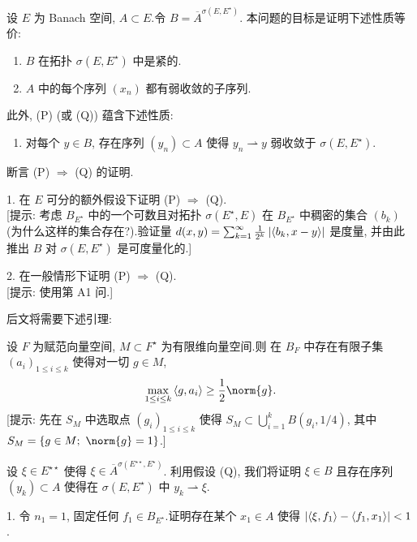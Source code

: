 \begin{problem}
\label{prob:10}
设 $E$ 为 Banach 空间, $A\subset E$.令 $B=\overline A^{\sigma(E,E^\star)}$.
本问题的目标是证明下述性质等价:
\begin{enumerate}[label=(\Alph*), itemsep=0.1em]
	\item[(P)] $B$ 在拓扑 $\sigma(E,E^\star)$ 中是紧的.
	\item[(Q)] $A$ 中的每个序列 $(x_n)$ 都有弱收敛的子序列.
\end{enumerate}
此外, (P) (或 (Q)) 蕴含下述性质:
\begin{enumerate}[label=(\Alph*), itemsep=0.1em]
	\item[(R)] 对每个 $y\in B$, 存在序列 $(y_n)\subset A$ 使得 $y_n\rightharpoonup y$ 弱收敛于 $\sigma(E,E^\star)$.
\end{enumerate}


断言 (P) $\Rightarrow$ (Q) 的证明.

1. 在 $E$ 可分的额外假设下证明 (P) $\Rightarrow$ (Q).\\
{[提示: 考虑 $B_{E^\star}$ 中的一个可数且对拓扑 $\sigma(E^\star,E)$ 在
$B_{E^\star}$ 中稠密的集合 $(b_k)$ (为什么这样的集合存在?).验证量
$d(x,y)=\sum_{k=1}^\infty\frac{1}{2^k}\left|\left\langle b_k,x-y\right\rangle\right|$ 是度量, 并由此推出
$B$ 对 $\sigma(E,E^\star)$ 是可度量化的.]}

2. 在一般情形下证明 (P) $\Rightarrow$ (Q).\\
{[提示: 使用第 A1 问.]}


后文将需要下述引理:

 设 $F$ 为赋范向量空间, $M\subset F^\star$ 为有限维向量空间.则
在 $B_F$ 中存在有限子集 $(a_i)_{1\le i\le k}$ 使得对一切 $g\in M$,
\begin{equation*}
\max_{1\le i\le k}\dual{g}{a_i}\ge\frac12\norm{g}.
\end{equation*}
[提示: 先在 $S_M$ 中选取点 $(g_i)_{1\le i\le k}$ 使得
$S_M\subset\bigcup_{i=1}^kB(g_i,1/4)$, 其中 $S_M=\{g\in M;\ \norm{g}=1\}$.]


设 $\xi\in E^{\star\star}$ 使得 $\xi\in\overline A^{\sigma(E^{\star\star},E^\star)}$.
利用假设 (Q), 我们将证明 $\xi\in B$ 且存在序列 $(y_k)\subset A$ 使得在
$\sigma(E,E^\star)$ 中 $y_k\rightharpoonup\xi$.

1. 令 $n_1=1$, 固定任何 $f_1\in B_{E^\star}$.证明存在某个 $x_1\in A$ 使得
$\left|\left\langle \xi,f_1\right\rangle-\left\langle f_1,x_1\right\rangle\right|<1$.


\end{problem}
